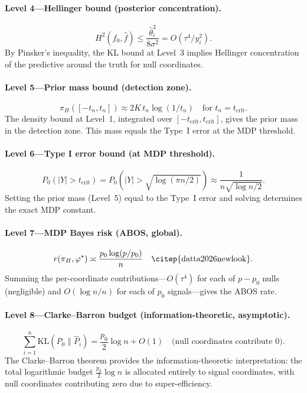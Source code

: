 \documentclass[12pt]{article}
\newcommand{\KL}{\mathrm{KL}}
\newcommand{\abs}[1]{\lvert #1 \rvert}
\newcommand{\piH}{\pi_H}
\newcommand{\tcrit}{t_{\mathrm{crit}}}
\begin{document}
\paragraph{Level 4---Hellinger bound (posterior concentration).}
\[
  H^2(f_0, \hat{f})
  \leq \frac{\hat\theta_i^2}{8\sigma^2}
  = O(\tau^4/y_i^2).
\]
By Pinsker's inequality, the KL bound at Level~3 implies Hellinger concentration of the predictive around the truth for null coordinates.

\paragraph{Level 5---Prior mass bound (detection zone).}
\[
  \piH([-t_n, t_n])
  \approx 2K\, t_n \log(1/t_n)
  \quad\text{for } t_n = \tcrit.
\]
The density bound at Level~1, integrated over $[-\tcrit, \tcrit]$, gives the prior mass in the detection zone. This mass equals the Type~I error at the MDP threshold.

\paragraph{Level 6---Type I error bound (at MDP threshold).}
\[
  P_0(\abs{Y} > \tcrit)
  = P_0\!\left(\abs{Y} > \sqrt{\log(\pi n/2)}\right)
  \approx \frac{1}{n\sqrt{\log n/2}}.
\]
Setting the prior mass (Level~5) equal to the Type~I error and solving determines the exact MDP constant.

\paragraph{Level 7---MDP Bayes risk (ABOS, global).}
\[
  r(\piH, \varphi^*)
  \asymp \frac{p_0 \log(p/p_0)}{n}
  \quad\text{\citep{datta2026newlook}}.
\]
Summing the per-coordinate contributions---$O(\tau^4)$ for each of $p - p_0$ nulls (negligible) and $O(\log n / n)$ for each of $p_0$ signals---gives the ABOS rate.

\paragraph{Level 8---Clarke--Barron budget (information-theoretic, asymptotic).}
\[
  \sum_{i=1}^n \KL(P_0 \| \hat{P}_i)
  = \frac{p_0}{2}\log n + O(1)
  \quad\text{(null coordinates contribute $0$)}.
\]
The Clarke--Barron theorem provides the information-theoretic interpretation: the total logarithmic budget $\frac{p_0}{2}\log n$ is allocated entirely to signal coordinates, with null coordinates contributing zero due to super-efficiency.
\end{document}
